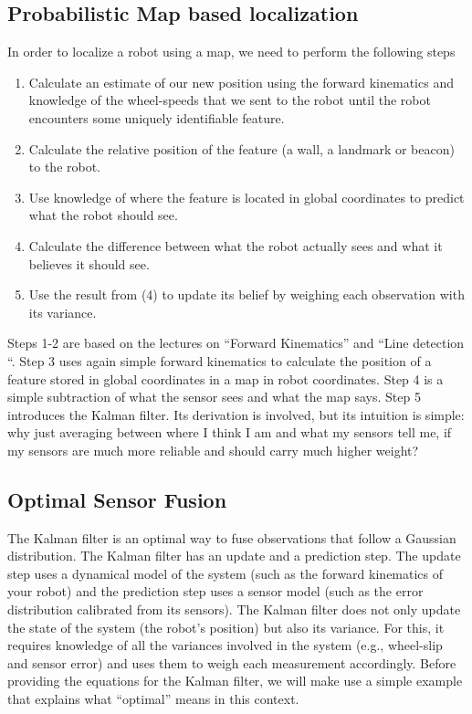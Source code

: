 \subsection{Probabilistic Map based localization}
In order to localize a robot using a map, we need to perform the following steps
\begin{enumerate}
\item Calculate an estimate of our new position using the forward kinematics and knowledge of the wheel-speeds that we sent to the robot until the robot encounters some uniquely identifiable feature.
\item Calculate the relative position of the feature (a wall, a landmark or beacon) to the robot.
\item Use knowledge of where the feature is located in global coordinates to predict what the robot should see.
\item Calculate the difference between what the robot actually sees and what it believes it should see.
\item Use the result from (4) to update its belief by weighing each observation with its variance.
\end{enumerate}

Steps 1-2 are based on the lectures on ``Forward Kinematics'' and ``Line detection ``. Step 3 uses again simple forward kinematics to calculate the position of a feature stored in global coordinates in a map in robot coordinates. Step 4 is a simple subtraction of what the sensor sees and what the map says. Step 5 introduces the Kalman filter. Its derivation is involved, but its intuition is simple: why just averaging between where I think I am and what my sensors tell me, if my sensors are much more reliable and should carry much higher weight?

\subsection{Optimal Sensor Fusion}
The Kalman filter is an optimal way to fuse observations that follow a Gaussian distribution. The Kalman filter has an update and a prediction step. The update step uses a dynamical model of the system (such as the forward kinematics of your robot) and the prediction step uses a sensor model (such as the error distribution calibrated from its sensors). The Kalman filter does not only update the state of the system (the robot's position) but also its variance. For this, it requires knowledge of all the variances involved in the system (e.g., wheel-slip and sensor error) and uses them to weigh each measurement accordingly. Before providing the equations for the Kalman filter, we will make use a simple example that explains what ``optimal'' means in this context.


